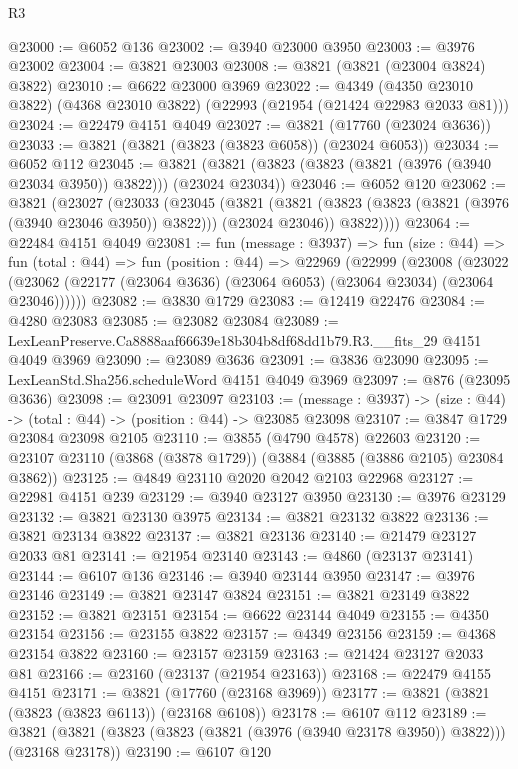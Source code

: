 \begin{lexlean}{R3}
\begin{coremodule}
@23000 := @6052 @136
@23002 := @3940 @23000 @3950
@23003 := @3976 @23002
@23004 := @3821 @23003
@23008 := @3821 (@3821 (@23004 @3824) @3822)
@23010 := @6622 @23000 @3969
@23022 := @4349
    (@4350 @23010 @3822)
    (@4368 @23010 @3822)
    (@22993 (@21954 (@21424 @22983 @2033 @81)))
@23024 := @22479 @4151 @4049
@23027 := @3821 (@17760 (@23024 @3636))
@23033 := @3821 (@3821 (@3823 (@3823 @6058)) (@23024 @6053))
@23034 := @6052 @112
@23045 := @3821 (@3821 (@3823 (@3823 (@3821 (@3976 (@3940 @23034 @3950)) @3822))) (@23024 @23034))
@23046 := @6052 @120
@23062 := @3821
    (@23027
      (@23033
        (@23045
          (@3821
            (@3821 (@3823 (@3823 (@3821 (@3976 (@3940 @23046 @3950)) @3822))) (@23024 @23046))
            @3822))))
@23064 := @22484 @4151 @4049
@23081 := fun (message : @3937) =>
  fun (size : @44) =>
  fun (total : @44) =>
  fun (position : @44) =>
  @22969
    (@22999
      (@23008
        (@23022 (@23062 (@22177 (@23064 @3636) (@23064 @6053) (@23064 @23034) (@23064 @23046))))))
@23082 := @3830 @1729
@23083 := @12419 @22476
@23084 := @4280 @23083
@23085 := @23082 @23084
@23089 := LexLeanPreserve.Ca8888aaf66639e18b304b8df68dd1b79.R3.__fits_29 @4151 @4049 @3969
@23090 := @23089 @3636
@23091 := @3836 @23090
@23095 := LexLeanStd.Sha256.scheduleWord @4151 @4049 @3969
@23097 := @876 (@23095 @3636)
@23098 := @23091 @23097
@23103 := (message : @3937) -> (size : @44) -> (total : @44) -> (position : @44) -> @23085 @23098
@23107 := @3847 @1729 @23084 @23098 @2105
@23110 := @3855 (@4790 @4578) @22603
@23120 := @23107 @23110 (@3868 (@3878 @1729)) (@3884 (@3885 (@3886 @2105) @23084 @3862))
@23125 := @4849 @23110 @2020 @2042 @2103 @22968
@23127 := @22981 @4151 @239
@23129 := @3940 @23127 @3950
@23130 := @3976 @23129
@23132 := @3821 @23130 @3975
@23134 := @3821 @23132 @3822
@23136 := @3821 @23134 @3822
@23137 := @3821 @23136
@23140 := @21479 @23127 @2033 @81
@23141 := @21954 @23140
@23143 := @4860 (@23137 @23141)
@23144 := @6107 @136
@23146 := @3940 @23144 @3950
@23147 := @3976 @23146
@23149 := @3821 @23147 @3824
@23151 := @3821 @23149 @3822
@23152 := @3821 @23151
@23154 := @6622 @23144 @4049
@23155 := @4350 @23154
@23156 := @23155 @3822
@23157 := @4349 @23156
@23159 := @4368 @23154 @3822
@23160 := @23157 @23159
@23163 := @21424 @23127 @2033 @81
@23166 := @23160 (@23137 (@21954 @23163))
@23168 := @22479 @4155 @4151
@23171 := @3821 (@17760 (@23168 @3969))
@23177 := @3821 (@3821 (@3823 (@3823 @6113)) (@23168 @6108))
@23178 := @6107 @112
@23189 := @3821 (@3821 (@3823 (@3823 (@3821 (@3976 (@3940 @23178 @3950)) @3822))) (@23168 @23178))
@23190 := @6107 @120

\end{coremodule}
\end{lexlean}
